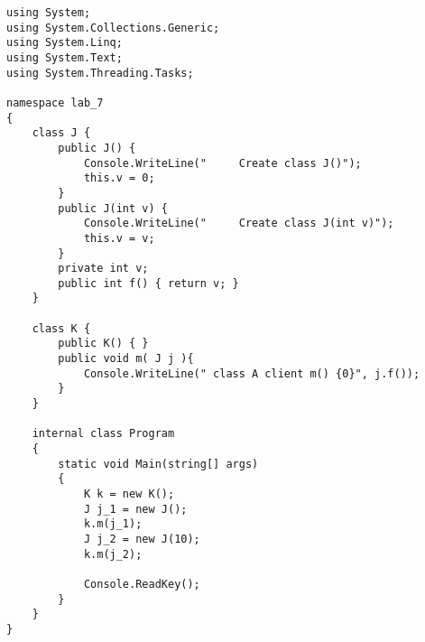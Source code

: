 \begin{lstlisting}[language={[Sharp]C}]
using System;
using System.Collections.Generic;
using System.Linq;
using System.Text;
using System.Threading.Tasks;

namespace lab_7
{
    class J {
        public J() {
            Console.WriteLine("     Create class J()");
            this.v = 0;
        }
        public J(int v) {
            Console.WriteLine("     Create class J(int v)");
            this.v = v;
        }
        private int v;
        public int f() { return v; }   
    }

    class K { 
        public K() { }
        public void m( J j ){ 
            Console.WriteLine(" class A client m() {0}", j.f()); 
        }
    } 

    internal class Program
    {
        static void Main(string[] args)
        {
            K k = new K();
            J j_1 = new J();
            k.m(j_1);
            J j_2 = new J(10);
            k.m(j_2);
                        
            Console.ReadKey();
        }
    }
}

\end{lstlisting}